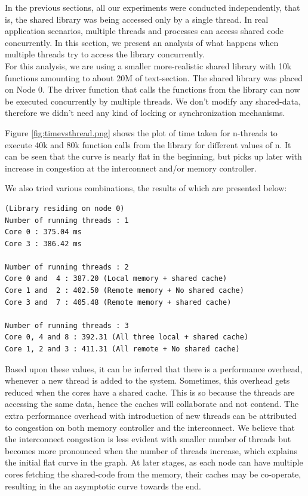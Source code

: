 In the previous sections, all our experiments were conducted independently, that is, the shared library
was being accessed only by a single thread. In real application scenarios, multiple threads and processes
can access shared code concurrently. In this section, we present an analysis of what happens when multiple
threads try to access the library concurrently.\\
For this analysis, we are using a smaller more-realistic shared library with 10k functions amounting to about 20M 
of text-section. The shared library was placed on Node 0. The driver function that calls the functions from 
the library can now be executed concurrently by multiple threads.
We don't modify any shared-data, therefore we didn't need any kind of locking or synchronization mechanisms.

Figure \ref{fig:timevsthread.png} shows the plot of time taken for n-threads to execute 40k and 80k function calls from
the library for different values of n. It can be seen that the curve is nearly flat in the beginning, but picks up
later with increase in congestion at the interconnect and/or memory controller.

We also tried various combinations, the results of which are presented below:
\begin{verbatim}
(Library residing on node 0)
Number of running threads : 1
Core 0 : 375.04 ms
Core 3 : 386.42 ms

Number of running threads : 2
Core 0 and  4 : 387.20 (Local memory + shared cache)
Core 1 and  2 : 402.50 (Remote memory + No shared cache)
Core 3 and  7 : 405.48 (Remote memory + shared cache)

Number of running threads : 3
Core 0, 4 and 8 : 392.31 (All three local + shared cache)
Core 1, 2 and 3 : 411.31 (All remote + No shared cache)
\end{verbatim}

Based upon these values, it can be inferred that there is a performance overhead, whenever a new thread is
added to the system. Sometimes, this overhead gets reduced when the cores have a shared cache. This is so because
the  threads are accessing the same data, hence the caches will collaborate and not contend. The extra performance
overhead with introduction of new threads can be attributed to congestion on both memory controller and the interconnect.
We believe that the interconnect congestion is less evident with smaller number of threads but becomes more pronounced
when the number of threads increase, which explains the initial flat curve in the graph. At later stages, as each node
can have multiple cores fetching the shared-code from the memory, their caches may be co-operate, resulting in the an
asymptotic curve towards the end.
